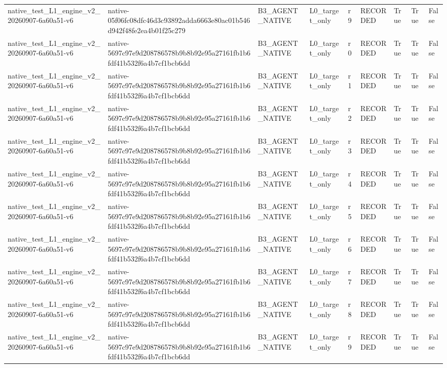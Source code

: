 \begin{tabular}{lllllllll}
native\_test\_L1\_engine\_v2\_20260907-6a60a51-v6 & native-05f06fc08dfc46d3c93892adda6663e80ac01b546d942f48fe2ea4b01f25c279 & B3\_AGENT\_NATIVE & L0\_target\_only & r9 & RECORDED & True & True & False \\
native\_test\_L1\_engine\_v2\_20260907-6a60a51-v6 & native-5697c97e9d208786578b9b8b92e95a27161fb1b6fdf41b532f6a4b7cf1bcb6dd & B3\_AGENT\_NATIVE & L0\_target\_only & r0 & RECORDED & True & True & False \\
native\_test\_L1\_engine\_v2\_20260907-6a60a51-v6 & native-5697c97e9d208786578b9b8b92e95a27161fb1b6fdf41b532f6a4b7cf1bcb6dd & B3\_AGENT\_NATIVE & L0\_target\_only & r1 & RECORDED & True & True & False \\
native\_test\_L1\_engine\_v2\_20260907-6a60a51-v6 & native-5697c97e9d208786578b9b8b92e95a27161fb1b6fdf41b532f6a4b7cf1bcb6dd & B3\_AGENT\_NATIVE & L0\_target\_only & r2 & RECORDED & True & True & False \\
native\_test\_L1\_engine\_v2\_20260907-6a60a51-v6 & native-5697c97e9d208786578b9b8b92e95a27161fb1b6fdf41b532f6a4b7cf1bcb6dd & B3\_AGENT\_NATIVE & L0\_target\_only & r3 & RECORDED & True & True & False \\
native\_test\_L1\_engine\_v2\_20260907-6a60a51-v6 & native-5697c97e9d208786578b9b8b92e95a27161fb1b6fdf41b532f6a4b7cf1bcb6dd & B3\_AGENT\_NATIVE & L0\_target\_only & r4 & RECORDED & True & True & False \\
native\_test\_L1\_engine\_v2\_20260907-6a60a51-v6 & native-5697c97e9d208786578b9b8b92e95a27161fb1b6fdf41b532f6a4b7cf1bcb6dd & B3\_AGENT\_NATIVE & L0\_target\_only & r5 & RECORDED & True & True & False \\
native\_test\_L1\_engine\_v2\_20260907-6a60a51-v6 & native-5697c97e9d208786578b9b8b92e95a27161fb1b6fdf41b532f6a4b7cf1bcb6dd & B3\_AGENT\_NATIVE & L0\_target\_only & r6 & RECORDED & True & True & False \\
native\_test\_L1\_engine\_v2\_20260907-6a60a51-v6 & native-5697c97e9d208786578b9b8b92e95a27161fb1b6fdf41b532f6a4b7cf1bcb6dd & B3\_AGENT\_NATIVE & L0\_target\_only & r7 & RECORDED & True & True & False \\
native\_test\_L1\_engine\_v2\_20260907-6a60a51-v6 & native-5697c97e9d208786578b9b8b92e95a27161fb1b6fdf41b532f6a4b7cf1bcb6dd & B3\_AGENT\_NATIVE & L0\_target\_only & r8 & RECORDED & True & True & False \\
native\_test\_L1\_engine\_v2\_20260907-6a60a51-v6 & native-5697c97e9d208786578b9b8b92e95a27161fb1b6fdf41b532f6a4b7cf1bcb6dd & B3\_AGENT\_NATIVE & L0\_target\_only & r9 & RECORDED & True & True & False \\

\end{tabular}
